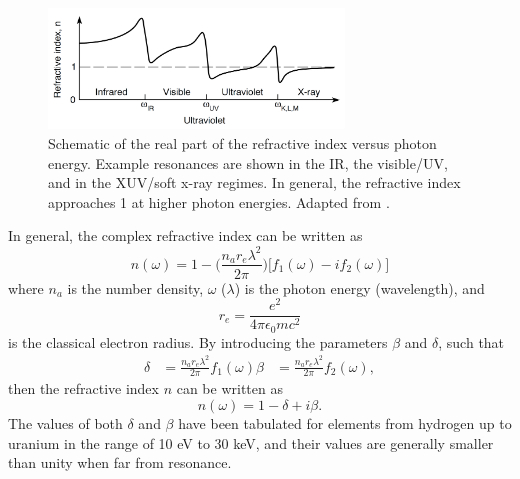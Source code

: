 \begin{figure}
	\centering
	\includegraphics[width=0.7\textwidth]{figures/refractive_index/attwood_real_n_schematic.png}
	\caption{Schematic of the real part of the refractive index versus photon energy. Example resonances are shown in the IR, the visible/UV, and in the XUV/soft x-ray regimes. In general, the refractive index approaches 1 at higher photon energies.  Adapted from \cite{attwoodSoftXraysExtreme2000}.}
	\label{fig:refractive_index_schematic}
\end{figure}

In general, the complex refractive index can be written as\cite{attwoodSoftXraysExtreme2000}
\begin{equation}
\label{eqn:refractive_index}
	n(\omega)=1 - \bigg(\frac{n_a r_e \lambda^2}{2\pi}\bigg)\bigg[f_1(\omega) - i f_2(\omega)\bigg]
\end{equation}
where $n_a$ is the number density, $\omega$ ($\lambda$) is the photon energy (wavelength), and
\begin{equation}
\label{eqn:r_e}
	r_e = \frac{e^2}{4\pi\epsilon_0 mc^2}
\end{equation}
is the classical electron radius. By introducing the parameters $\beta$ and $\delta$, such that
\begin{equation}
\label{eqn:delta_beta_def}
	\begin{aligned}
	\delta &= \frac{n_a r_e \lambda^2}{2\pi}f_1(\omega)
	\beta & = \frac{n_a r_e \lambda^2}{2\pi}f_2(\omega),
	\end{aligned}
\end{equation}
then the refractive index $n$ can be written as
\begin{equation}
\label{eqn:refractive_index_db}
	n(\omega)=1-\delta+i\beta.
\end{equation}
The values of both $\delta$ and $\beta$ have been tabulated for elements from hydrogen up to uranium in the range of 10 eV to 30 keV\cite{henkeLowenergyXrayInteraction1982}, and their values are generally smaller than unity when far from resonance.


